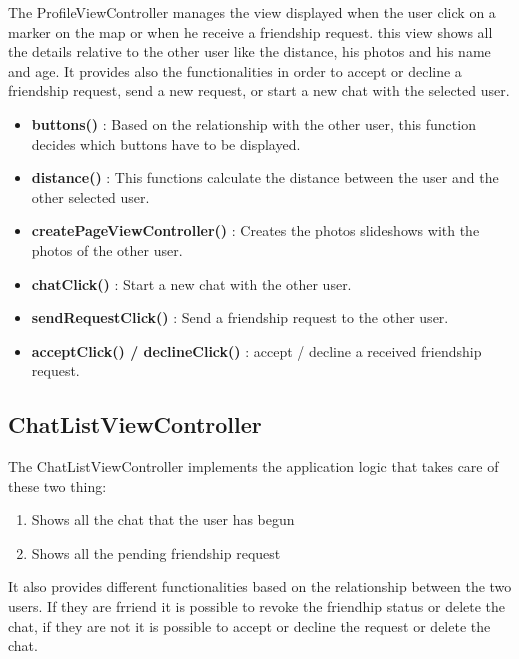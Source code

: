 The ProfileViewController manages the view displayed when the user click on a marker on the map or when he receive a friendship request. this view shows all the details relative to the other user like the distance, his photos and his name and age. It provides also the functionalities in order to accept or decline a friendship request, send a new request, or start a new chat with the selected user.

\begin{itemize}
\item \textbf{buttons()} : Based on the relationship with the other user, this function decides which buttons have to be displayed.
\item \textbf{distance()} : This functions calculate the distance between the user and the other selected user.
\item \textbf{createPageViewController()} : Creates the photos slideshows with the photos of the other user.
\item \textbf{chatClick()} : Start a new chat with the other user.
\item \textbf{sendRequestClick()} : Send a friendship request to the other user.
\item \textbf{acceptClick() / declineClick()} : accept / decline a received friendship request.
\end{itemize}


\subsection{ChatListViewController} 

The ChatListViewController implements the application logic that takes care of these two thing:

\begin{enumerate}
\item Shows all the chat that the user has begun
\item Shows all the pending friendship request
\end{enumerate}

It also provides different functionalities based on the relationship between the two users. If they are frriend it is possible to revoke the friendhip status or delete the chat, if they are not it is possible to accept or decline the request or delete the chat.

